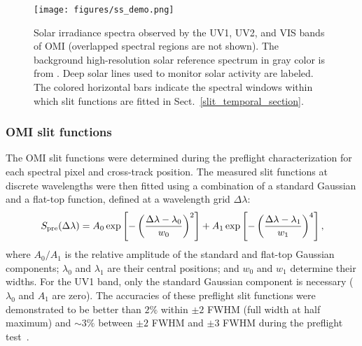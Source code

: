 \documentclass[amt,manuscript]{copernicus}
\begin{document}
\begin{figure*}[tbhp]

\texttt{[image: figures/ss\_demo.png]}
\caption{Solar irradiance spectra observed by the UV1, UV2, and VIS bands of OMI (overlapped spectral regions are not shown). The background high-resolution solar reference spectrum in gray color is from \citet{dobber2008high}. Deep solar lines used to monitor solar activity are labeled. The colored horizontal bars indicate the spectral windows within which slit functions are fitted in Sect.~\ref{slit_temporal_section}.}
\label{ss_demo}
\end{figure*}

\subsubsection{OMI slit functions}

The OMI slit functions were determined during the preflight characterization for each spectral pixel and cross-track position. The measured slit functions at discrete wavelengths were then fitted using a combination of a standard Gaussian and a flat-top function, defined at a wavelength grid $\Delta \lambda$:
\begin{equation}
S_{\textnormal{pre}}(\Delta \lambda) = A_0 \exp \left[-\left(\frac{\Delta \lambda-\lambda_0}{w_0} \right)^2 \right] + A_1 \exp \left[-\left(\frac{\Delta \lambda-\lambda_1}{w_1} \right)^4\right],
\label{eq1}
\end{equation}
where $A_0/A_1$ is the relative amplitude of the standard and flat-top Gaussian components; $\lambda_0$ and $\lambda_1$ are their central positions; and $w_0$ and $w_1$ determine their widths. For the UV1 band, only the standard Gaussian component is necessary ($\lambda_0$ and $A_1$ are zero). The accuracies of these preflight slit functions were demonstrated to be better than $2\%$ within $\pm 2$ FWHM (full width at half maximum) and $\sim 3\%$ between $\pm2$ FWHM and $\pm3$ FWHM during the preflight test~\citep{dobber2008high}.
\end{document}
